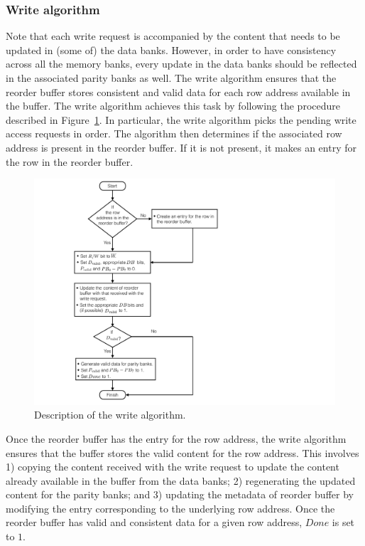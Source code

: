 \subsubsection{Write algorithm}
\label{sec:write}
Note that each write request is accompanied by the content that needs to be updated in (some of) the data banks. However, in order to have consistency across all the memory banks, every update in the data banks should be reflected in the associated parity banks as well. The write algorithm ensures that the reorder buffer stores consistent and valid data for each row address available in the buffer. The write algorithm achieves this task by following the procedure described in Figure~\ref{fig:write}. In particular, the write algorithm picks the pending write access requests in order. The algorithm then determines if the associated row address is present in the reorder buffer. If it is not present, it makes an entry for the row in the reorder buffer.

\begin{figure}[h!] \centering
\includegraphics[width=0.80\linewidth]{figures/Write-algo-new.pdf} 
\caption{Description of the write algorithm.}
\label{fig:write}
\end{figure}


Once the reorder buffer has the entry for the row address, the write algorithm ensures that the buffer stores the valid content for the row address. This involves 1) copying the content received with the write request to update the content already available in the buffer from the data banks; 2) regenerating the updated content for the parity banks; and 3) updating the metadata of reorder buffer by modifying the entry corresponding to the underlying row address. Once the reorder buffer has valid and consistent data for a given row address, $Done$ is set to $1$. 


